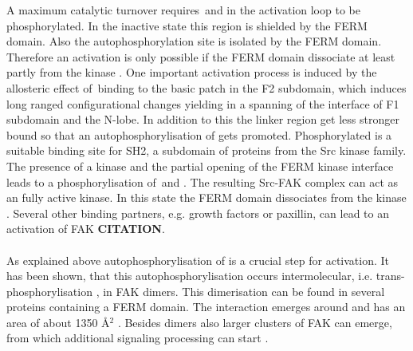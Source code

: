 A maximum catalytic turnover requires \,and  in the activation loop to be phosphorylated. In the inactive state this region is shielded by the FERM domain. Also the autophosphorylation site  is isolated by the FERM domain. Therefore an activation is only possible if the FERM domain dissociate at least partly from the kinase \autocite{structFAK}. One important activation process is induced by the allosteric effect of \pip\,binding to the basic patch in the F2 subdomain, which induces long ranged configurational changes yielding in a spanning of the interface of F1 subdomain and the N-lobe. In addition to this the linker region get less stronger bound so that an autophosphorylisation of  gets promoted. Phosphorylated  is a suitable binding site for SH2, a subdomain of proteins from the Src kinase family. The presence of a kinase and the partial opening of the FERM kinase interface leads to a phosphorylisation of \,and . The resulting Src-FAK complex can act as an fully active kinase. In this state the FERM domain dissociates from the kinase \autocites{pap003}{pap001}. %
Several other binding partners, e.g. growth factors or paxillin, can lead to an activation of FAK \textbf{CITATION}.\\
\\
As explained above autophosphorylisation of  is a crucial step for activation. It has been shown, that this autophosphorylisation occurs intermolecular, i.e. trans-phosphorylisation \autocite{transAuto}, in FAK dimers. This dimerisation can be found in several proteins containing a FERM domain. The interaction emerges around  and has an area of about 1350 \AA$^2$ \autocite{fakdimers}. Besides dimers also larger clusters of FAK can emerge, from which additional signaling processing can start \autocite{dimersVsClusters}.\\ %

